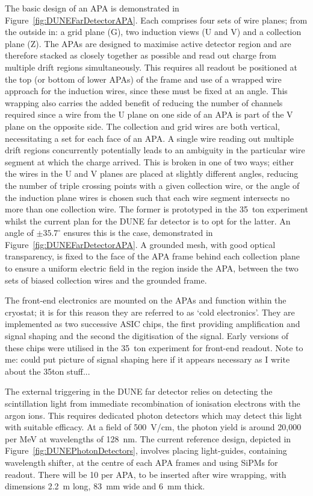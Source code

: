 The basic design of an APA is demonstrated in Figure~\ref{fig:DUNEFarDetectorAPA}.  Each comprises four sets of wire planes; from the outside in: a grid plane (G), two induction views (U and V) and a collection plane (Z).  The APAs are designed to maximise active detector region and are therefore stacked as closely together as possible and read out charge from multiple drift regions simultaneously.  This requires all readout be positioned at the top (or bottom of lower APAs) of the frame and use of a wrapped wire approach for the induction wires, since these must be fixed at an angle.  This wrapping also carries the added benefit of reducing the number of channels required since a wire from the U plane on one side of an APA is part of the V plane on the opposite side.  The collection and grid wires are both vertical, necessitating a set for each face of an APA.  A single wire reading out multiple drift regions concurrently potentially leads to an ambiguity in the particular wire segment at which the charge arrived.  This is broken in one of two ways; either the wires in the U and V planes are placed at slightly different angles, reducing the number of triple crossing points with a given collection wire, or the angle of the induction plane wires is chosen such that each wire segment intersects no more than one collection wire.  The former is prototyped in the 35~ton experiment whilst the current plan for the DUNE far detector is to opt for the latter.  An angle of $\pm35.7^{\circ}$ ensures this is the case, demonstrated in Figure~\ref{fig:DUNEFarDetectorAPA}.  A grounded mesh, with good optical transparency, is fixed to the face of the APA frame behind each collection plane to ensure a uniform electric field in the region inside the APA, between the two sets of biased collection wires and the grounded frame.

The front-end electronics are mounted on the APAs and function within the cryostat; it is for this reason they are referred to as `cold electronics'.  They are implemented as two successive ASIC chips, the first providing amplification and signal shaping and the second the digitisation of the signal.  Early versions of these chips were utilised in the 35~ton experiment for front-end readout. {\color{red} Note to me: could put picture of signal shaping here if it appears necessary as I write about the 35ton stuff...}

The external triggering in the DUNE far detector relies on detecting the scintillation light from immediate recombination of ionisation electrons with the argon ions.  This requires dedicated photon detectors which may detect this light with suitable efficacy.  At a field of 500~V/cm, the photon yield is around 20,000 per MeV at wavelengths of 128~nm.  The current reference design, depicted in Figure~\ref{fig:DUNEPhotonDetectors}, involves placing light-guides, containing wavelength shifter, at the centre of each APA frames and using SiPMs for readout.  There will be 10 per APA, to be inserted after wire wrapping, with dimensions 2.2~m long, 83~mm wide and 6~mm thick.

